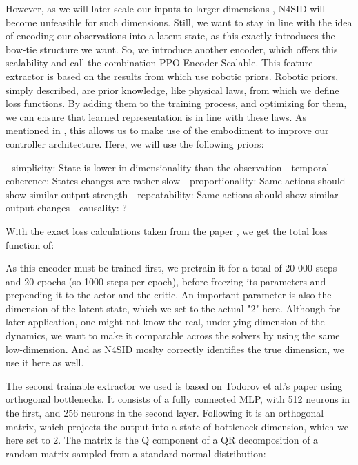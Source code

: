However, as we will later scale our inputs to larger dimensions , N4SID will become unfeasible for such dimensions.
Still, we want to stay in line with the idea of encoding our observations into a latent state, as this exactly introduces the bow-tie structure
we want. So, we introduce another encoder, which offers this scalability and call the combination PPO Encoder Scalable. This feature extractor
is based on the results from  which use robotic priors. Robotic priors, simply described,
are prior knowledge, like physical laws, from which we define loss functions. By adding them to the training process, and optimizing for them, we can
ensure that learned representation is in line with these laws. As mentioned in , this allows us to make use of the embodiment
to improve our controller architecture. Here, we will use the following priors:

- simplicity: State is lower in dimensionality than the observation
- temporal coherence: States changes are rather slow
- proportionality: Same actions should show similar output strength
- repeatability: Same actions should show similar output changes
- causality: ?

With the exact loss calculations taken from the paper ,
we get the total loss function of:


As this encoder must be trained first, we pretrain it for a total of 20 000 steps
and 20 epochs (so 1000 steps per epoch), before freezing its parameters and prepending
it to the actor and the critic. An important parameter is also the dimension of the latent
state, which we set to the actual "2" here. Although for later application, one might not know
the real, underlying dimension of the dynamics, we want to make it comparable across the solvers by
using the same low-dimension. And as N4SID moslty correctly identifies the true dimension, we use it
here as well. 

The second trainable extractor we used is based on Todorov et al.'s paper
using orthogonal bottlenecks. It consists of a fully connected MLP, with 512 neurons in the first,
and 256 neurons in the second layer. Following it is an orthogonal matrix, which projects the output
into a state of bottleneck dimension, which we here set to 2. The matrix is the Q component of a QR decomposition
of a random matrix sampled from a standard normal distribution:


